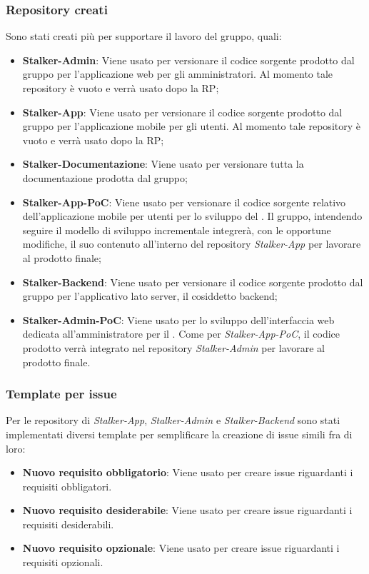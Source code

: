 \subsubsection{Repository creati}
Sono stati creati più  per supportare il lavoro del gruppo, quali:
\begin{itemize}
	\item \textbf{Stalker-Admin}: Viene usato per versionare il codice sorgente prodotto dal gruppo per l'applicazione web per gli amministratori. Al momento tale repository è vuoto e verrà usato dopo la RP;
	\item \textbf{Stalker-App}: Viene usato per versionare il codice sorgente prodotto dal gruppo per l'applicazione mobile per gli utenti. Al momento tale repository è vuoto e verrà usato dopo la RP;
	\item \textbf{Stalker-Documentazione}: Viene usato per versionare tutta la documentazione prodotta dal gruppo;
	\item \textbf{Stalker-App-PoC}: Viene usato per versionare il codice sorgente relativo dell'applicazione mobile per utenti per lo sviluppo del .
	Il gruppo, intendendo seguire il modello di sviluppo incrementale integrerà, con le opportune modifiche, il suo contenuto all'interno del repository \textit{Stalker-App} per lavorare al prodotto finale;
	\item \textbf{Stalker-Backend}: Viene usato per versionare il codice sorgente prodotto dal gruppo per l'applicativo lato server, il cosiddetto backend;
	\item \textbf{Stalker-Admin-PoC}: Viene usato per lo sviluppo dell'interfaccia web dedicata all'amministratore per il .
	Come per \textit{Stalker-App-PoC}, il codice prodotto verrà integrato nel repository \textit{Stalker-Admin} per lavorare al prodotto finale.
\end{itemize}

\subsubsection{Template per issue}
Per le repository di \textit{Stalker-App}, \textit{Stalker-Admin} e \textit{Stalker-Backend} sono stati implementati diversi template per semplificare la creazione di issue simili fra di loro:
\begin{itemize}
\item \textbf{Nuovo requisito obbligatorio}: Viene usato per creare issue riguardanti i requisiti obbligatori.
\item \textbf{Nuovo requisito desiderabile}: Viene usato per creare issue riguardanti i requisiti desiderabili.
\item \textbf{Nuovo requisito opzionale}: Viene usato per creare issue riguardanti i requisiti opzionali.
\end{itemize}

